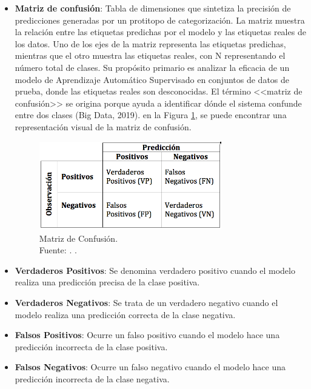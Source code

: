 \begin{itemize}
\item \textbf{Matriz de confusión}: Tabla de dimensiones que sintetiza la precisión de predicciones generadas por un protitopo de categorización. La matriz muestra la relación entre las etiquetas predichas por el modelo y las etiquetas reales de los datos. Uno de los ejes de la matriz representa las etiquetas predichas, mientras que el otro muestra las etiquetas reales, con N representando el número total de clases. Su propósito primario es analizar la eficacia de un modelo de Aprendizaje Automático Supervisado en conjuntos de datos de prueba, donde las etiquetas reales son desconocidas. El término <<matriz de confusión>> se origina porque ayuda a identificar dónde el sistema confunde entre dos clases (Big Data, 2019). en la Figura \ref{3:fig7}, se puede encontrar una representación visual de la matriz de confusión.
\begin{figure}[H]
	\centering
	\includegraphics[width=0.75\textwidth]{3/figures/matriz_confusion.png}
	\caption[Matriz de Confusión]{Matriz de Confusión.\\ Fuente: \cite{izco2018bdc}. .}
	\label{3:fig7}
\end{figure}
\end{itemize}

\begin{itemize}
    \item \textbf{Verdaderos Positivos}: Se denomina verdadero positivo cuando el modelo realiza una predicción precisa de la clase positiva.
    \item \textbf{Verdaderos Negativos}: Se trata de un verdadero negativo cuando el modelo realiza una predicción correcta de la clase negativa.
    \item \textbf{Falsos Positivos}: Ocurre un falso positivo cuando el modelo hace una predicción incorrecta de la clase positiva. 
    \item \textbf{Falsos Negativos}: Ocurre un falso negativo cuando el modelo hace una predicción incorrecta de la clase negativa. 
    \end{itemize}


